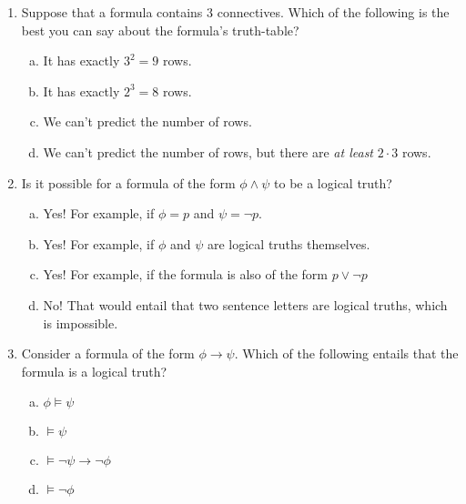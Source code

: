 	\begin{enumerate}[\thesection.1]

		\item Suppose that a formula contains 3 connectives. Which of the following is the best you can say about the formula's truth-table?
		
		\begin{enumerate}[(a)]
		
			\item It has exactly $3^2=9$ rows.
			
			\item It has exactly $2^3=8$ rows.
			
			\item We can't predict the number of rows.
			
			\item We can't predict the number of rows, but there are \emph{at least} $2\cdot 3$ rows.
		
		\end{enumerate}
		
		\item Is it possible for a formula of the form $\phi\land\psi$ to be a logical truth?
		
			\begin{enumerate}[(a)]
			
				\item Yes! For example, if $\phi=p$ and $\psi=\neg p$.
				
				\item Yes! For example, if $\phi$ and $\psi$ are logical truths themselves.
				
				\item Yes! For example, if the formula is also of the form $p\lor\neg p$
				
				\item No! That would entail that two sentence letters are logical truths, which is impossible.
			
			\end{enumerate}
	
		
		\item Consider a formula of the form $\phi\to\psi$. Which of the following entails that the formula is a logical truth?
		
			\begin{enumerate}[(a)]
			
				\item $\phi\vDash\psi$
				
				\item $\vDash \psi$
				
				\item $\vDash \neg\psi\to\neg\phi$
				
				\item $\vDash\neg\phi$
			
			\end{enumerate}
	
	\end{enumerate}

